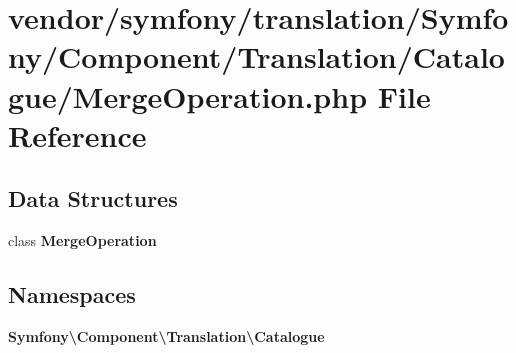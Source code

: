 \section{vendor/symfony/translation/\+Symfony/\+Component/\+Translation/\+Catalogue/\+Merge\+Operation.php File Reference}
\label{_merge_operation_8php}
\subsection*{Data Structures}
\begin{DoxyCompactItemize}
\item 
class {\bf Merge\+Operation}
\end{DoxyCompactItemize}
\subsection*{Namespaces}
\begin{DoxyCompactItemize}
\item 
 {\bf Symfony\textbackslash{}\+Component\textbackslash{}\+Translation\textbackslash{}\+Catalogue}
\end{DoxyCompactItemize}
